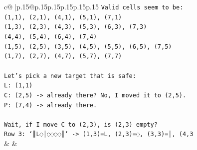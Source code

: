 \documentclass{article}
\begin{document}
{\begin{supertabular}{c@{$\;$}|p{.15\linewidth}@{}p{.15\linewidth}p{.15\linewidth}p{.15\linewidth}p{.15\linewidth}p{.15\linewidth}}
{{{\texttt{Valid cells seem to be:} \\
\texttt{(1,1), (2,1), (4,1), (5,1), (7,1)} \\
\texttt{(1,3), (2,3), (4,3), (5,3), (6,3), (7,3)} \\
\texttt{(4,4), (5,4), (6,4), (7,4)} \\
\texttt{(1,5), (2,5), (3,5), (4,5), (5,5), (6,5), (7,5)} \\
\texttt{(1,7), (2,7), (4,7), (5,7), (7,7)} \\
\\ 
\texttt{Let's pick a new target that is safe:} \\
\texttt{L: (1,1)} \\
\texttt{C: (2,5) {-}> already there? No, I moved it to (2,5).} \\
\texttt{P: (7,4) {-}> already there.} \\
\\ 
\texttt{Wait, if I move C to (2,3), is (2,3) empty?} \\
\texttt{Row 3: `║L◌│◌◌◌◌║` {-}> (1,3)=L, (2,3)=◌, (3,3)=│, (4,3} \\
            }
        }
    }
    & & \\ \\


\end{supertabular}}
\end{document}
